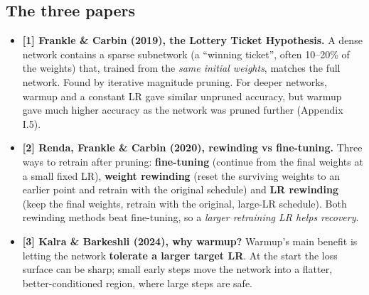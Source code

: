 \documentclass[11pt,a4paper]{article}
\begin{document}
\subsection{The three papers}
\begin{itemize}
  \item \textbf{[1] Frankle \& Carbin (2019), the Lottery Ticket Hypothesis.} A dense network contains a sparse subnetwork
        (a ``winning ticket'', often 10--20\% of the weights) that, trained from the \emph{same initial weights}, matches the
        full network. Found by iterative magnitude pruning. For deeper networks, warmup and a constant LR gave similar
        unpruned accuracy, but warmup gave much higher accuracy as the network was pruned further (Appendix I.5).
  \item \textbf{[2] Renda, Frankle \& Carbin (2020), rewinding vs fine-tuning.} Three ways to retrain after pruning:
        \textbf{fine-tuning} (continue from the final weights at a small fixed LR), \textbf{weight rewinding} (reset the
        surviving weights to an earlier point and retrain with the original schedule) and \textbf{LR rewinding} (keep the
        final weights, retrain with the original, large-LR schedule). Both rewinding methods beat fine-tuning, so a
        \emph{larger retraining LR helps recovery}.
  \item \textbf{[3] Kalra \& Barkeshli (2024), why warmup?} Warmup's main benefit is letting the network \textbf{tolerate a
        larger target LR}. At the start the loss surface can be sharp; small early steps move the network into a flatter,
        better-conditioned region, where large steps are safe.
\end{itemize}
\end{document}

